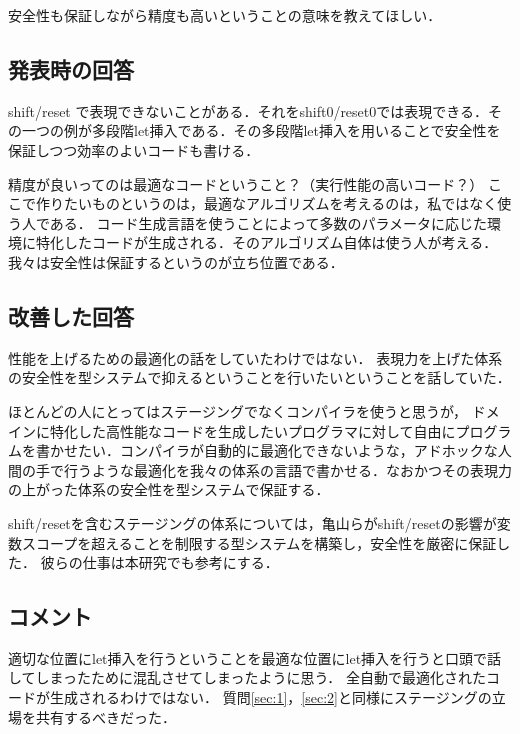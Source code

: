 \documentclass[10pt,a4j,xcolor=dvipsnames,twocolumn]{jarticle}
\theoremstyle{definition}
\begin{document}
安全性も保証しながら精度も高いということの意味を教えてほしい．

\subsection{発表時の回答}
shift/reset で表現できないことがある．それをshift0/reset0では表現できる．その一つの例が多段階let挿入である．その多段階let挿入を用いることで安全性を保証しつつ効率のよいコードも書ける．

精度が良いってのは最適なコードということ？（実行性能の高いコード？）
ここで作りたいものというのは，最適なアルゴリズムを考えるのは，私ではなく使う人である．
コード生成言語を使うことによって多数のパラメータに応じた環境に特化したコードが生成される．そのアルゴリズム自体は使う人が考える．我々は安全性は保証するというのが立ち位置である．

\subsection{改善した回答}
性能を上げるための最適化の話をしていたわけではない．
表現力を上げた体系の安全性を型システムで抑えるということを行いたいということを話していた．

ほとんどの人にとってはステージングでなくコンパイラを使うと思うが，
ドメインに特化した高性能なコードを生成したいプログラマに対して自由にプログラムを書かせたい．コンパイラが自動的に最適化できないような，アドホックな人間の手で行うような最適化を我々の体系の言語で書かせる．なおかつその表現力の上がった体系の安全性を型システムで保証する．

shift/resetを含むステージングの体系については，亀山ら\cite{Kameyama2009}がshift/resetの影響が変数スコープを超えることを制限する型システムを構築し，安全性を厳密に保証した．
彼らの仕事は本研究でも参考にする．


\subsection{コメント}
適切な位置にlet挿入を行うということを最適な位置にlet挿入を行うと口頭で話してしまったために混乱させてしまったように思う．
全自動で最適化されたコードが生成されるわけではない．
質問\ref{sec:1}，\ref{sec:2}と同様にステージングの立場を共有するべきだった．




\end{document}

